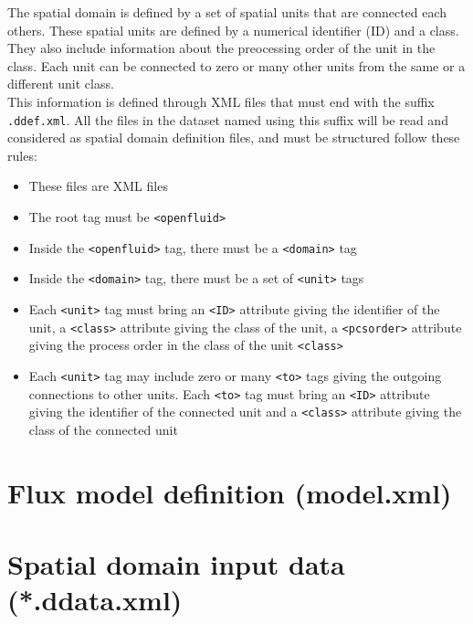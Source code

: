 The spatial domain is defined by a set of spatial units that are connected each
others. These spatial units are defined by a numerical identifier (ID) and a
class. They also include information about the preocessing order of the unit in
the class. Each unit can be connected to zero or many other units from the
same or a different unit class.\\
\noindent This information is defined through XML files that must end with the
suffix \texttt{.ddef.xml}. All the files in the dataset named using this suffix will be read and considered as spatial domain definition files, and must be
structured follow these rules:
\begin{itemize}
  \item These files are XML files
  \item The root tag must be \texttt{<openfluid>}
  \item Inside the \texttt{<openfluid>} tag, there must be a \texttt{<domain>} tag
  \item Inside the \texttt{<domain>} tag, there must be a set
  of \texttt{<unit>} tags 
  \item Each \texttt{<unit>} tag must bring an \texttt{<ID>} attribute giving
  the identifier of the unit, a \texttt{<class>} attribute giving the class of
  the unit, a \texttt{<pcsorder>} attribute giving the process order in the
  class of the unit \texttt{<class>}
  \item Each \texttt{<unit>} tag may include zero or many \texttt{<to>} tags giving
  the outgoing connections to other units. Each \texttt{<to>} tag must bring an \texttt{<ID>} attribute giving
  the identifier of the connected unit and a \texttt{<class>} attribute giving the class of
  the connected unit  
\end{itemize}


\bigskip

\section{Flux model definition (model.xml)}


\bigskip

\section{Spatial domain input data (*.ddata.xml)}

